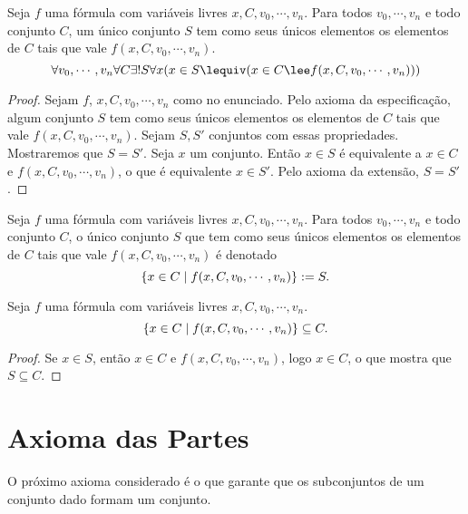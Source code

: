 \begin{prop}
Seja $f$ uma fórmula com variáveis livres $x,C,v_0,\cdots,v_n$. Para todos $v_0,\cdots,v_n$ e todo conjunto $C$, um único conjunto $S$ tem como seus únicos elementos os elementos de $C$ tais que vale $f(x,C,v_0,\cdots,v_n)$.
	\begin{equation*}
	\forall v_0,\cdots,v_n \forall C \exists! S \forall x(x \in S \lequiv (x \in C \lee f(x,C,v_0,\cdots,v_n)))
	\end{equation*}
\end{prop}
\begin{proof}
Sejam $f$, $x,C,v_0,\cdots,v_n$ como no enunciado. Pelo axioma da especificação, algum conjunto $S$ tem como seus únicos elementos os elementos de $C$ tais que vale $f(x,C,v_0,\cdots,v_n)$. Sejam $S,S'$ conjuntos com essas propriedades. Mostraremos que $S=S'$. Seja $x$ um conjunto. Então $x \in S$ é equivalente a $x \in C$ e $f(x,C,v_0,\cdots,v_n)$, o que é equivalente $x \in S'$. Pelo axioma da extensão, $S=S'$.
\end{proof}

\begin{defi}
Seja $f$ uma fórmula com variáveis livres $x,C,v_0,\cdots,v_n$. Para todos $v_0,\cdots,v_n$ e todo conjunto $C$, o único conjunto $S$ que tem como seus únicos elementos os elementos de $C$ tais que vale $f(x,C,v_0,\cdots,v_n)$ é denotado
	\begin{equation*}
	\left\{x \in C \;\middle\vert\; f(x,C,v_0,\cdots,v_n) \right\} := S.
	\end{equation*}
\end{defi}

\begin{prop}
Seja $f$ uma fórmula com variáveis livres $x,C,v_0,\cdots,v_n$.
	\begin{equation*}
	\left\{x \in C \;\middle\vert\; f(x,C,v_0,\cdots,v_n) \right\} \subseteq C.
	\end{equation*}
\end{prop}
\begin{proof}
Se $x \in S$, então $x \in C$ e $f(x,C,v_0,\cdots,v_n)$, logo $x \in C$, o que mostra que $S \subseteq C$.
\end{proof}

\section{Axioma das Partes}

O próximo axioma considerado é o que garante que os subconjuntos de um conjunto dado formam um conjunto.


